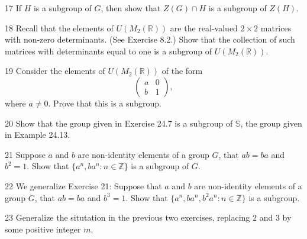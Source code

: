 \begin{problem}{17}
    If $H$ is a subgroup of $G$, then show that $Z(G) \cap H$
        is a subgroup of $Z(H)$.
\end{problem}
\unsolved

\begin{problem}{18}
    Recall that the elements of $U(M_2(\mathbb{R}))$ are the real-valued $2 \times 2$
    matrices with non-zero determinants. (See Exercise 8.2.) Show that the collection of
    such matrices with determinants equal to one is a subgroup of $U(M_2(\mathbb{R}))$.
\end{problem}
\unsolved

\begin{problem}{19}
    Consider the elements of $U(M_2(\mathbb{R}))$ of the form
    \[\begin{pmatrix} a & 0 \\ b & 1 \end{pmatrix},\]
    where $a \neq 0$. Prove that this is a subgroup.
\end{problem}
\unsolved

\begin{problem}{20}
    Show that the group given in Exercise 24.7 is a subgroup of $\mathbb{S}$, the group
    given in Example 24.13.
\end{problem}
\unsolved

\begin{problem}{21}
    Suppose $a$ and $b$ are non-identity elements of a group $G$, that $ab = ba$ and
    $b^2 = 1$. Show that $\{a^n, ba^n : n \in \mathbb{Z}\}$ is a subgroup of $G$.
\end{problem}
\unsolved

\begin{problem}{22}
    We generalize Exercise 21: Suppose that $a$ and $b$ are non-identity elements of a
    group $G$, that $ab = ba$ and $b^3 = 1$. Show that
    $\{a^n, ba^n, b^2a^n : n \in \mathbb{Z}\}$ is a subgroup.
\end{problem}
\unsolved

\begin{problem}{23}
    Generalize the situtation in the previous two exercises,
        replacing $2$ and $3$ by some positive integer $m$.
\end{problem}
\unsolved

